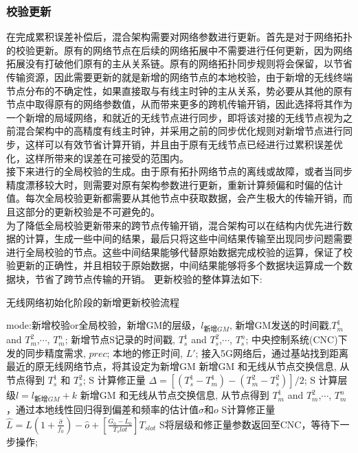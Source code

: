 \documentclass[UTF8,a4paper,12pt]{ctexart}
\numberwithin{equation}{section}
\begin{document}
\subsubsection{校验更新}
在完成累积误差补偿后，混合架构需要对网络参数进行更新。首先是对于网络拓扑的校验更新。原有的网络节点在后续的网络拓展中不需要进行任何更新，因为网络拓展没有打破他们原有的主从关系链。原有的网络拓扑同步规则将会保留，以节省传输资源，因此需要更新的就是新增的网络节点的本地校验，由于新增的无线终端节点分布的不确定性，如果直接取与有线主时钟的主从关系，势必要从其他的原有节点中取得原有的网络参数值，从而带来更多的跨机传输开销，因此选择将其作为一个新增的局域网络，和就近的无线节点进行同步，即将该对接的无线节点视为之前混合架构中的高精度有线主时钟，并采用之前的同步优化规则对新增节点进行同步，这样可以有效节省计算开销，并且由于原有无线节点已经进行过累积误差优化，这样所带来的误差在可接受的范围内。\\
接下来进行的全局校验的生成。由于原有拓扑网络节点的离线或故障，或者当同步精度漂移较大时，则需要对原有架构参数进行更新，重新计算频偏和时偏的估计值。每次全局校验更新都需要从其他节点中获取数据，会产生极大的传输开销，而且这部分的更新校验是不可避免的。\\
为了降低全局校验更新带来的跨节点传输开销，混合架构可以在结构内优先进行数据的计算，生成一些中间的结果，最后只将这些中间结果传输至出现同步问题需要进行全局校验的节点。这些中间结果能够代替原始数据完成校验的运算，保证了校验更新的正确性，并且相较于原始数据，中间结果能够将多个数据块运算成一个数据块，节省了跨节点传输的开销。
更新校验的整体算法如下:
\begin{algorithm}[ht]  
	\caption{无线网络初始化阶段的新增更新校验流程}  
	\begin{algorithmic}[1]
		\REQUIRE mode:新增校验or全局校验，新增GM的层级，$l_{新增GM}$, 新增GM发送的时间戳,$T_m^1$ and $T_m^2$,$\cdots$, $T_m^n$; 新增节点S记录的时间戳, $T_s^1$ and $T_s^2$,$\cdots$, $T_s^n$; 中央控制系统(CNC)下发的同步精度需求, $prec$;
		\ENSURE 本地的修正时间, $L'$;
		\STATE 接入5G网络后，通过基站找到距离最近的原无线网络节点，将其设定为新增GM
		\STATE 新增GM 和无线从节点交换信息, 从节点得到 $T_s^1$ 和 $T_s^2$; 
		\STATE S 计算修正量 $\Delta = [(T_s^1 - T_m^1) - (T_m^2 - T_s^2)]/2$;
		\STATE S 计算层级$l=l_{新增GM}+k$
		\ELSE  
		\STATE 新增GM 和无线从节点交换信息, 从节点得到 $T_m^1$ and $T_m^2$,$\cdots$, $T_m^n$，通过本地线性回归得到偏差和频率的估计值$\sigma$和$o$	
		\STATE S计算修正量$\widehat{L}=L(1+\frac{\widehat{\sigma}}{f_0})-\widehat{o}+[\frac{G_0-L_0}{T_slot}]T_{slot}$			
		\ENDIF
		\STATE S将层级和修正量参数返回至CNC，等待下一步操作;
		\ENDWHILE
		\ENDWHILE
		\ENDIF
	\end{algorithmic}
\end{algorithm}
\end{document}
